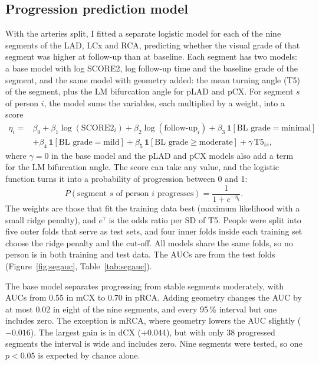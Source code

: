 \documentclass[11pt,a4paper]{article}
\begin{document}
\subsection{Progression prediction model}
With the arteries split, I fitted a separate
logistic model for each of the nine segments of the LAD, LCx and RCA, predicting whether the visual grade of
that segment was higher at follow-up than at baseline. Each segment has two models: a base
model with log SCORE2, log follow-up time and the baseline grade of the segment, and the
same model with geometry added: the mean turning angle (T5) of the segment, plus the LM
bifurcation angle for pLAD and pCX. For segment $s$ of person $i$, the model sums the
variables, each multiplied by a weight, into a score
\begin{equation}
  \begin{split}
  \eta_i = {} & \beta_0 + \beta_1 \log(\mathrm{SCORE2}_i) + \beta_2 \log(\text{follow-up}_i)
                + \beta_3 \,\mathbf{1}[\text{BL grade} = \text{minimal}] \\
              & + \beta_4 \,\mathbf{1}[\text{BL grade} = \text{mild}]
                + \beta_5 \,\mathbf{1}[\text{BL grade} \geq \text{moderate}]
                + \gamma\, \mathrm{T5}_{is},
  \end{split}
  \label{eq:logit}
\end{equation}
where $\gamma = 0$ in the base model and the pLAD and pCX models also add a term for the LM
bifurcation angle. The score can take any value, and the logistic function turns it into a
probability of progression between 0 and 1:
\begin{equation}
  P(\text{segment } s \text{ of person } i \text{ progresses}) = \frac{1}{1 + e^{-\eta_i}}.
  \label{eq:logistic}
\end{equation}
The weights are those that fit the training data best (maximum likelihood with a small ridge
penalty), and $e^{\gamma}$ is the odds ratio per SD of T5. People were split into five outer folds that serve as
test sets, and four inner folds inside each training set choose the ridge penalty and the
cut-off. All models share the same folds, so no person is in both training and test data.
The AUCs are from the test folds (Figure~\ref{fig:segauc}, Table~\ref{tab:segauc}).

The base model separates progressing from stable segments moderately,
with AUCs from 0.55 in mCX to 0.70 in pRCA. Adding geometry changes the AUC by at most
0.02 in eight of the nine segments, and every 95\,\% interval but one includes zero. The
exception is mRCA, where geometry lowers the AUC slightly ($-0.016$). The largest gain is in
dCX ($+0.044$), but with only 38 progressed segments the interval is wide and includes
zero. Nine segments were tested, so one $p < 0.05$ is expected by chance alone.
\end{document}
